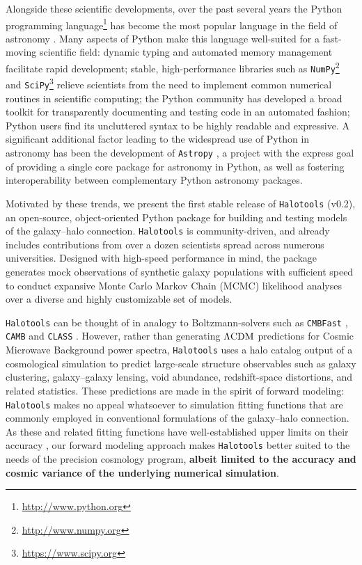 \documentclass[twocolumn, tighten]{aastex6}
\begin{document}
Alongside these scientific developments, over the past several years the Python programming language\footnote{\url{http://www.python.org}} has become the most popular language in the field of astronomy \citep{momcheva_tollerud15}. Many aspects of Python make this language well-suited for a fast-moving scientific field: dynamic typing and automated memory management facilitate rapid development; stable, high-performance libraries such as {\tt NumPy}\footnote{\url{http://www.numpy.org}}\citep{numpy_array} and {\tt SciPy}\footnote{\url{https://www.scipy.org}}\citep{scipy} relieve scientists from the need to implement common numerical routines in scientific computing; the Python community has developed a broad toolkit for transparently documenting and testing code in an automated fashion; Python users find its uncluttered syntax to be highly readable and expressive. A significant additional factor leading to the widespread use of Python in astronomy has been the development of  {\tt Astropy} \citep{astropy}, a project with the express goal of providing a single core package for astronomy in Python, as well as fostering interoperability between complementary Python astronomy packages.

Motivated by these trends, we present the first stable release of {\tt Halotools} (v0.2), an open-source, object-oriented Python package for building and testing models of the galaxy--halo connection. {\tt Halotools} is community-driven, and already includes contributions from over a dozen scientists spread across numerous universities. Designed with high-speed performance in mind, the package generates mock observations of synthetic galaxy populations with sufficient speed to conduct expansive  Monte Carlo Markov Chain (MCMC) likelihood analyses over a diverse and highly customizable set of models. 

{\tt Halotools} can be thought of in analogy to Boltzmann-solvers such as {\tt CMBFast} \citep{cmbfast}, {\tt CAMB} \citep{camb} and {\tt CLASS} \citep{class}. However, rather than generating $\Lambda{\rm CDM}$ predictions for Cosmic Microwave Background power spectra, {\tt Halotools} uses a halo catalog output of a cosmological simulation to predict large-scale structure observables such as galaxy clustering, galaxy--galaxy lensing, void abundance, redshift-space distortions, and related statistics. These predictions are made in the spirit of forward modeling: {\tt Halotools} makes no appeal whatsoever to simulation fitting functions \citep[e.g.,][]{sheth_tormen01,tinker05} that are commonly employed in conventional formulations of the galaxy--halo connection. As these and related fitting functions have well-established upper limits on their accuracy \citep[e.g.,][]{tinker08a}, our forward modeling approach makes {\tt Halotools} better suited to the needs of the precision cosmology program, {\bf albeit limited to the accuracy and cosmic variance of the underlying numerical simulation}. 
\end{document}
